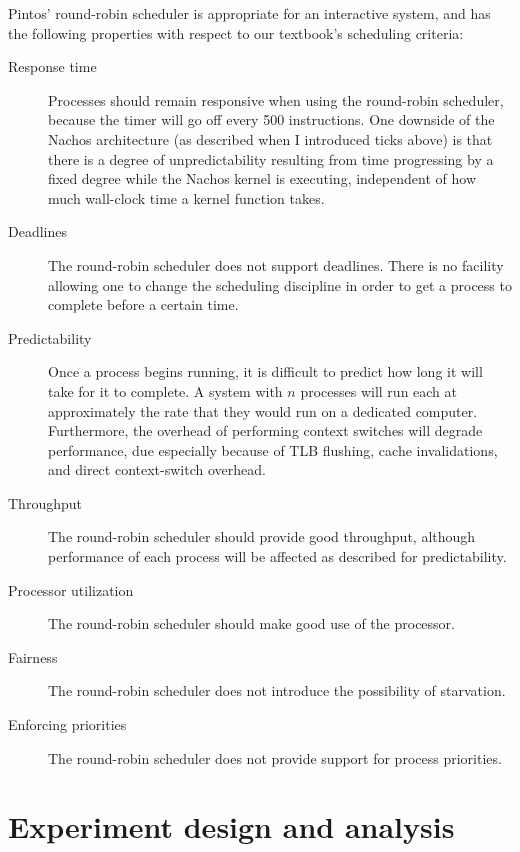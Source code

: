 \documentclass{article}
\begin{document}
Pintos' round-robin scheduler is appropriate for an interactive system,
and has the following properties with respect to our textbook's scheduling criteria:
\begin{description}
\item[Response time] Processes should remain responsive when using
the round-robin scheduler, because the timer will go off every 500
instructions. One downside of the Nachos architecture (as described when
I introduced ticks above) is that there is a degree of unpredictability
resulting from time progressing by a fixed degree while the Nachos kernel
is executing, independent of how much wall-clock time a kernel function
takes.

\item[Deadlines] The round-robin scheduler does not support deadlines.
There is no facility allowing one to change the scheduling discipline
in order to get a process to complete before a certain time.

\item[Predictability] Once a process begins running, it is difficult to predict how long it will take for it to complete.
A system with $n$ processes will run each at approximately  the rate that they would run on a dedicated computer.
Furthermore, the overhead of performing context switches will degrade performance,
due especially because of TLB flushing, cache invalidations, and direct context-switch overhead.

\item[Throughput] The round-robin scheduler should provide good
throughput, although performance of each process will be affected as
described for predictability.

\item[Processor utilization] The round-robin scheduler should make good use of the processor.

\item[Fairness] The round-robin scheduler does not introduce the possibility of starvation.

\item[Enforcing priorities] The round-robin scheduler does not provide support for process priorities.

\end{description}

\section{Experiment design and analysis}
\end{document}
